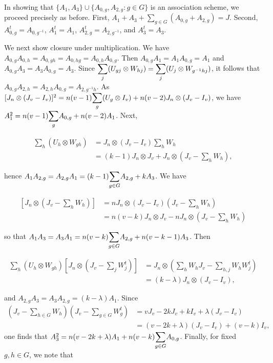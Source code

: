 \documentclass[../../../main]{subfiles}
\begin{document}
In showing that $\{A_1,A_3\}\cup\{A_{0,g},A_{2,g} : g \in G\}$ is an association scheme, we proceed precisely as before. First, $A_1+A_3 + \sum_{g \in G}(A_{0,g}+A_{2,g}) = J$. Second, $A_{0,g}^t = A_{0,g^{-1}}$, $A_1^t=A_1$, $A_{2,g}^t = A_{2,g^{-1}}$, and $A_3^t = A_3$.

We next show closure under multiplication. We have $A_{0,g}A_{0,h} = A_{0,gh} = A_{0,hg} = A_{0,h}A_{0,g}$. Then $A_{0,g}A_1 = A_1A_{0,g} = A_1$ and $A_{0,g}A_3 = A_3A_{0,g} = A_3$. Since $\ssum_j (U_{gj} \otimes W_{hj}) = \ssum_j (U_j \otimes W_{g^{-1}hj})$, it follows that $A_{0,g}A_{2,h} = A_{2,h}A_{0,g} = A_{2,g^{-1}h}$. As $[J_n \otimes (J_v-I_v)]^2 = n(v-1)\ssum_g(U_g \otimes I_v) + n(v-2)J_n \otimes (J_v-I_v)$, we have $A_1^2 = n(v-1)\ssum_g A_{0,g} + n(v-2)A_1$. Next,
\begin{small}
\begin{align*}
 [J_n \otimes (J_v-I_v)]\sum_h(U_h \otimes W_{gh}) &= J_n \otimes (J_v-I_v)\sum_hW_h \\
 &= (k-1)J_n \otimes J_v + J_n \otimes (J_v - \sum_hW_h),
\end{align*}
\end{small}
hence $A_1A_{2,g} = A_{2,g}A_1 = (k-1)\ssum_{g \in G}A_{2,g} + kA_3$. We have
\begin{small}
\begin{align*}
 [J_n \otimes (J_v-I_v)]\left[J_n \otimes (J_v-\sum_hW_h)\right] &= nJ_n \otimes (J_v-I_v)\left(J_v-\sum_hW_h\right) \\
 &= n(v-k)J_n \otimes J_v - nJ_n \otimes \left(J_v-\sum_hW_h\right)
\end{align*}
\end{small}
so that $A_1A_3 = A_3A_1 = n(v-k)\ssum_{g \in G}A_{2,g} + n(v-k-1)A_3$. Then
\begin{small}
\begin{align*}
 \sum_h (U_h \otimes W_{gh})\left[J_n \otimes (J_v-\sum_jW_j^t)\right] &= J_n \otimes \left(\sum_hW_hJ_v - \sum_{h,j}W_hW_j^t\right) \\
 &= (k-\lambda)J_n \otimes (J_v-I_v),
\end{align*}
\end{small}
and $A_{2,g}A_3 = A_3A_{2,g} = (k-\lambda)A_1$. Since
\begin{align*}
 \left(J_v-\sum_{h \in G}W_h\right)\left(J_v-\sum_{g \in G}W_g^t\right) &= vJ_v - 2kJ_v + kI_v + \lambda(J_v-I_v) \\
 &= (v-2k+\lambda)(J_v-I_v) + (v-k)I_v,
\end{align*}
one finds that $A_3^2 = n(v-2k+\lambda)A_1 + n(v-k)\ssum_{g \in G}A_{0,g}$. Finally, for fixed $g,h \in G$, we note that
\end{document}

